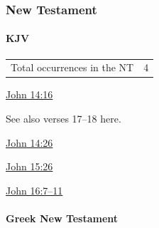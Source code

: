 			
		
		
	\subsubsection{New Testament} %
		\label{COMFORTER-NT}
	
		\paragraph{KJV}
			\label{COMFORTER-NT-KJV}		
	
			\begin{tabular}{ll}
				Total occurrences in the NT & 4
			\end{tabular}
			
			\begin{compactdesc}
				\item[{\hyperref[JOHN-14-16]{John 14:16}}] \phantom{.}
					\begin{compactitem}
						\item See also verses 17--18 here.
					\end{compactitem}
				\item[{\hyperref[JOHN-14-26]{John 14:26}}]
				\item[{\hyperref[JOHN-15-26]{John 15:26}}]
				\item[{\hyperref[JOHN-16-7]{John 16:7--11}}]
			\end{compactdesc}
			
		\paragraph{Greek New Testament} %
			\label{COMFORTER-GREEK}
		
